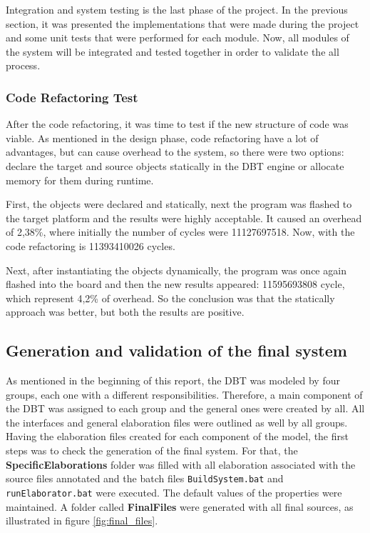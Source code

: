 
Integration and system testing is the last phase of the project. In the previous section, it was presented the implementations that were made during the project and some unit tests that were performed for each module. Now, all modules of the system will be integrated and tested together in order to validate the all process.

\subsubsection{Code Refactoring Test}
\par After the code refactoring, it was time to test if the new structure of code was viable. As mentioned in the design phase, code refactoring have a lot of advantages, but can cause overhead to the system, so there were two options: declare the target and source objects statically in the DBT engine or allocate memory for them during runtime. 
\par First, the objects were declared and statically, next the program was flashed to the target platform and the results were highly acceptable. It caused an overhead of 2,38\%, where initially the number of cycles were 11127697518. Now, with the code refactoring is 11393410026 cycles.
\par Next, after instantiating the objects dynamically, the program was once again flashed into the board and then the new results appeared: 11595693808 cycle, which represent 4,2\% of overhead. So the conclusion was that the statically approach was better, but both the results are positive.

\subsection{Generation and validation of the final system}

As mentioned in the beginning of this report, the DBT was modeled by four groups, each one with a different responsibilities. Therefore, a main component of the DBT was assigned to each group and the general ones were created by all. All the interfaces and general elaboration files were outlined as well by all groups. \\

Having the elaboration files created for each component of the model, the first steps was to check the generation of the final system. For that, the \textbf{SpecificElaborations} folder was filled with all elaboration associated with the source files annotated and the batch files \texttt{BuildSystem.bat} and \texttt{runElaborator.bat} were executed. The default values of the properties were maintained. A folder called \textbf{FinalFiles} were generated with all final sources, as illustrated in figure \ref{fig:final_files}.


